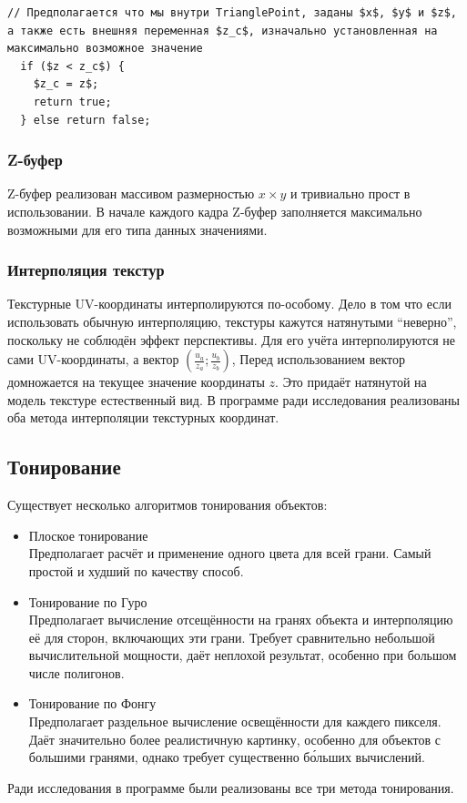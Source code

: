 \documentclass[a4paper,12pt]{report}
\numberwithin{equation}{section}
\begin{document}
\begin{lstlisting}[float=p,caption={Отслеживания взгляда пользователя},label=trace_algo]
// Предполагается что мы внутри TrianglePoint, заданы $x$, $y$ и $z$, а также есть внешняя переменная $z_c$, изначально установленная на максимально возможное значение
  if ($z < z_c$) {
    $z_c = z$;
    return true;
  } else return false;
\end{lstlisting}

\subsubsection{Z-буфер}
Z-буфер реализован массивом размерностью $x \times y$ и тривиально прост в использовании. В начале каждого кадра Z-буфер заполняется максимально возможными для его типа данных значениями.

\subsubsection{Интерполяция текстур}
Текстурные UV-координаты интерполируются по-особому. Дело в том что если использовать обычную интерполяцию, текстуры кажутся натянутыми ``неверно'', поскольку не соблюдён эффект перспективы. Для его учёта интерполируются не сами UV-координаты, а вектор $\left( \frac{u_a}{z_a}; \frac{u_b}{z_b} \right)$, Перед использованием вектор домножается на текущее значение координаты $z$. Это придаёт натянутой на модель текстуре естественный вид. В программе ради исследования реализованы оба метода интерполяции текстурных координат.

\subsection{Тонирование}
Существует несколько алгоритмов тонирования объектов:
\begin{itemize}
\item Плоское тонирование \\
Предполагает расчёт и применение одного цвета для всей грани. Самый простой и худший по качеству способ.
\item Тонирование по Гуро \cite{gouraudshading} \\
Предполагает вычисление отсещённости на гранях объекта и интерполяцию её для сторон, включающих эти грани. Требует сравнительно небольшой вычислительной мощности, даёт неплохой результат, особенно при большом числе полигонов.
\item Тонирование по Фонгу \cite{phongmodel} \\
Предполагает раздельное вычисление освещённости для каждего пикселя. Даёт значительно более реалистичную картинку, особенно для объектов с большими гранями, однако требует существенно б\'{о}льших вычислений.
\end{itemize}
Ради исследования в программе были реализованы все три метода тонирования.
\end{document}
